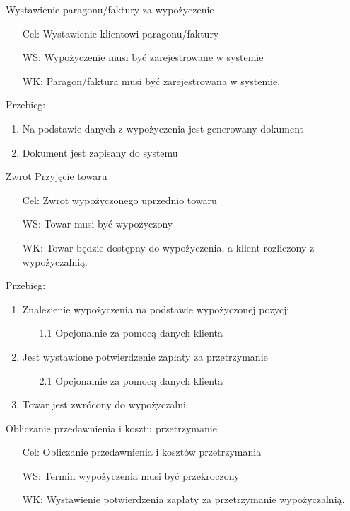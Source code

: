 \documentclass{article}
\begin{document}
\Large	Wystawienie paragonu/faktury za wypożyczenie 
\normalsize
\begin{enumerate}
	\item[Cel:] Wystawienie klientowi paragonu/faktury
	\item[WS:] Wypożyczenie musi być zarejestrowane w systemie
	\item[WK:]  Paragon/faktura musi być zarejestrowana w systemie.
\end{enumerate}
	Przebieg:
	\begin{enumerate}
		\item Na podstawie danych z wypożyczenia jest generowany dokument
		\item 	Dokument jest zapisany do systemu
	\end{enumerate}

\LARGE	Zwrot \newline
\Large	Przyjęcie towaru\newline
\normalsize
\begin{enumerate}
	\item[Cel:] Zwrot wypożyczonego uprzednio towaru
	\item[WS:] Towar musi być wypożyczony
	\item[WK:]  Towar będzie dostępny do wypożyczenia, a klient rozliczony z wypożyczalnią.
\end{enumerate}

	Przebieg:
	\begin{enumerate}
		\item Znalezienie wypożyczenia na podstawie wypożyczonej pozycji.
		\begin{enumerate}
			\item [1.1] Opcjonalnie za pomocą danych klienta 
		\end{enumerate}
		\item Jest wystawione potwierdzenie zapłaty za przetrzymanie
			\begin{enumerate}
			\item [2.1] Opcjonalnie za pomocą danych klienta 
		\end{enumerate}
		\item Towar jest zwrócony do wypożyczalni.
	\end{enumerate}

	
\Large	Obliczanie przedawnienia i kosztu przetrzymanie\newline
\normalsize
\begin{enumerate}
	\item[Cel:] Obliczanie przedawnienia i kosztów przetrzymania
	\item[WS:] Termin wypożyczenia musi być przekroczony
	\item[WK:]  Wystawienie potwierdzenia zapłaty za przetrzymanie wypożyczalnią.
\end{enumerate}
\end{document}
